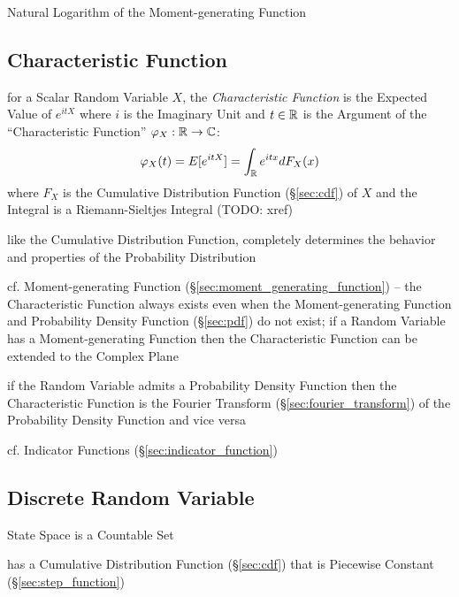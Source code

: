 Natural Logarithm of the Moment-generating Function



\subsection{Characteristic Function}\label{sec:characteristic_function}

for a Scalar Random Variable $X$, the \emph{Characteristic Function} is the
Expected Value of $e^{itX}$ where $i$ is the Imaginary Unit and $t \in \mathbb{R}$
is the Argument of the ``Characteristic Function'' $\varphi_X : \mathbb{R}
\rightarrow \mathbb{C}$:
\[
  \varphi_X(t) = E[e^{itX}] = \int_{\mathbb{R}} e^{itx} dF_X(x)
\]
where $F_X$ is the Cumulative Distribution Function (\S\ref{sec:cdf}) of $X$ and
the Integral is a Riemann-Sieltjes Integral (TODO: xref)

like the Cumulative Distribution Function, completely determines the behavior
and properties of the Probability Distribution

cf. Moment-generating Function (\S\ref{sec:moment_generating_function}) --
the Characteristic Function always exists even when the Moment-generating
Function and Probability Density Function (\S\ref{sec:pdf}) do not exist;
if a Random Variable has a Moment-generating Function then the Characteristic
Function can be extended to the Complex Plane

if the Random Variable admits a Probability Density Function then the
Characteristic Function is the Fourier Transform (\S\ref{sec:fourier_transform})
of the Probability Density Function and vice versa

\fist cf. Indicator Functions (\S\ref{sec:indicator_function})



\subsection{Discrete Random Variable}\label{sec:discrete_random_variable}

State Space is a Countable Set

has a Cumulative Distribution Function (\S\ref{sec:cdf}) that is Piecewise
Constant (\S\ref{sec:step_function})

